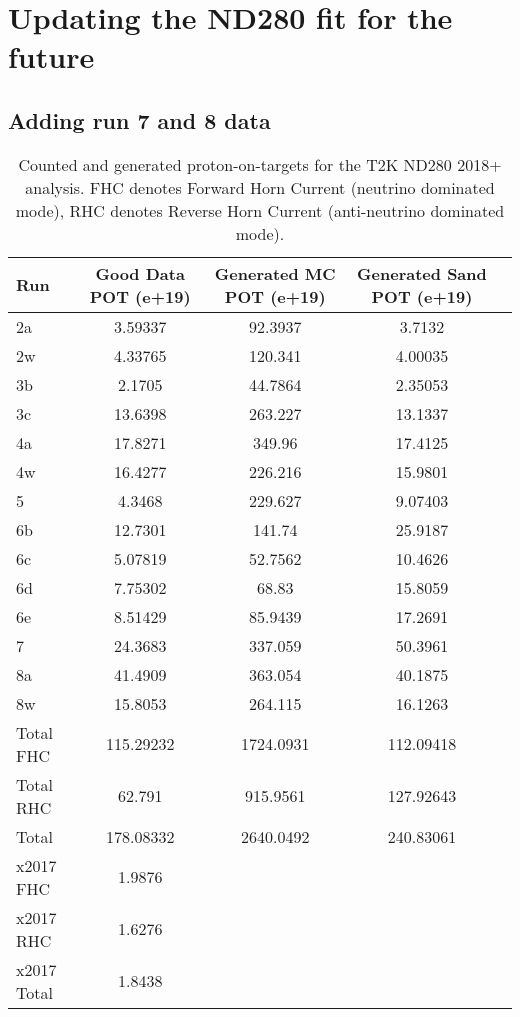 \chapter{Updating the ND280 fit for the future}

\section{Adding run 7 and 8 data}

\begin{table}[htbp]
	\centering
	\begin{tabular}{ l c c c c }
		\hline
		Run & Good Data POT (e+19) & Generated MC POT (e+19) & Generated Sand POT (e+19) \\
		\hline
		\hline
		2a  & 3.59337    & 92.3937     & 3.7132  \\
		2w  & 4.33765    & 120.341     & 4.00035 \\
		\hline
		3b  & 2.1705     & 44.7864     & 2.35053 \\
		3c  & 13.6398    & 263.227     & 13.1337 \\
		\hline
		4a  & 17.8271    & 349.96      & 17.4125 \\
		4w  & 16.4277    & 226.216     & 15.9801 \\
		\hline
		5   & 4.3468     & 229.627     & 9.07403 \\
		\hline
		6b  & 12.7301    & 141.74      & 25.9187 \\
		6c  & 5.07819    & 52.7562     & 10.4626 \\
		6d  & 7.75302    & 68.83       & 15.8059 \\
		6e  & 8.51429    & 85.9439     & 17.2691 \\
		\hline
		7   & 24.3683	 & 337.059     & 50.3961 \\
		\hline
		8a  & 41.4909	 & 363.054	   & 40.1875 \\
		8w  & 15.8053    & 264.115 	   & 16.1263 \\
		\hline
		Total FHC & 115.29232 & 1724.0931 &  112.09418 \\
		Total RHC & 62.791 	  & 915.9561  &  127.92643 \\
		Total 	  & 178.08332 & 2640.0492 &  240.83061 \\
		\hline
		x2017 FHC   & 1.9876 \\
		x2017 RHC   & 1.6276 \\
		x2017 Total & 1.8438 \\
	\end{tabular}
	\caption{Counted and generated proton-on-targets for the T2K ND280 2018+ analysis. FHC denotes Forward Horn Current (neutrino dominated mode), RHC denotes Reverse Horn Current (anti-neutrino dominated mode).}
	\label{tab:pot_2018}
\end{table}


